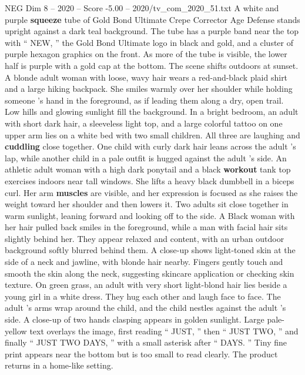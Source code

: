 \begin{textsample}{NEG Dim 8 – 2020 – Score -5.00 – 2020/tv\_com\_2020\_51.txt}  \label{ex:f8_neg_044}
A white and purple \textbf{squeeze} tube of Gold Bond Ultimate Crepe Corrector Age Defense stands upright against a dark teal background.
The tube has a purple band near the top with “ NEW, ” the Gold Bond Ultimate logo in black and gold, and a cluster of purple hexagon graphics on the front.
As more of the tube is visible, the lower half is purple with a gold cap at the bottom.
The scene shifts outdoors at sunset.
A blonde adult woman with loose, wavy hair wears a red-and-black plaid shirt and a large hiking backpack.
She smiles warmly over her shoulder while holding someone ’s hand in the foreground, as if leading them along a dry, open trail.
Low hills and glowing sunlight fill the background.
In a bright bedroom, an adult with short dark hair, a sleeveless light top, and a large colorful tattoo on one upper arm lies on a white bed with two small children.
All three are laughing and \textbf{cuddling} close together.
One child with curly dark hair leans across the adult ’s lap, while another child in a pale outfit is hugged against the adult ’s side.
An athletic adult woman with a high dark ponytail and a black \textbf{workout} tank top exercises indoors near tall windows.
She lifts a heavy black dumbbell in a biceps curl.
Her arm \textbf{muscles} are visible, and her expression is focused as she raises the weight toward her shoulder and then lowers it.
Two adults sit close together in warm sunlight, leaning forward and looking off to the side.
A Black woman with her hair pulled back smiles in the foreground, while a man with facial hair sits slightly behind her.
They appear relaxed and content, with an urban outdoor background softly blurred behind them.
A close-up shows light-toned skin at the side of a neck and jawline, with blonde hair nearby.
Fingers gently touch and smooth the skin along the neck, suggesting skincare application or checking skin texture.
On green grass, an adult with very short light-blond hair lies beside a young girl in a white dress.
They hug each other and laugh face to face.
The adult ’s arms wrap around the child, and the child nestles against the adult ’s side.
A close-up of two hands clasping appears in golden sunlight.
Large pale-yellow text overlays the image, first reading “ JUST, ” then “ JUST TWO, ” and finally “ JUST TWO DAYS, ” with a small asterisk after “ DAYS. ” Tiny fine print appears near the bottom but is too small to read clearly.
The product returns in a home-like setting.

\end{textsample}
